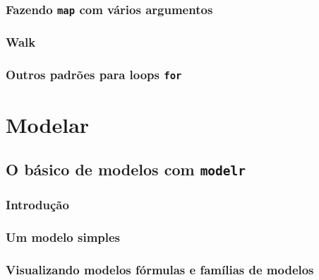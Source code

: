 \documentclass[
]{latex/krantz}
\theoremstyle{definition}
\theoremstyle{definition}
\theoremstyle{definition}
\theoremstyle{definition}
\theoremstyle{remark}
\begin{document}
\hypertarget{fazendo-map-com-vuxe1rios-argumentos}{%
\section{\texorpdfstring{Fazendo \texttt{map} com vários argumentos}{Fazendo map com vários argumentos}}\label{fazendo-map-com-vuxe1rios-argumentos}}

\hypertarget{walk}{%
\section{Walk}\label{walk}}

\hypertarget{outros-padruxf5es-para-loops-for}{%
\section{\texorpdfstring{Outros padrões para loops \texttt{for}}{Outros padrões para loops for}}\label{outros-padruxf5es-para-loops-for}}

\hypertarget{part-modelar}{%
\part{Modelar}\label{part-modelar}}

\hypertarget{o-buxe1sico-de-modelos-com-modelr}{%
\chapter{\texorpdfstring{O básico de modelos com \texttt{modelr}}{O básico de modelos com modelr}}\label{o-buxe1sico-de-modelos-com-modelr}}

\hypertarget{introduuxe7uxe3o-14}{%
\section{Introdução}\label{introduuxe7uxe3o-14}}

\hypertarget{um-modelo-simples}{%
\section{Um modelo simples}\label{um-modelo-simples}}

\hypertarget{visualizando-modelos-fuxf3rmulas-e-famuxedlias-de-modelos}{%
\section{Visualizando modelos fórmulas e famílias de modelos}\label{visualizando-modelos-fuxf3rmulas-e-famuxedlias-de-modelos}}
\end{document}
